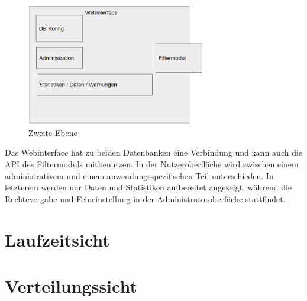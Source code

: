 \begin{figure}[h]
	\centering
	\includegraphics[width=0.7\textwidth]{Graphics/blackbox2.png}
	\caption{Zweite Ebene}
	\label{fig:zweite_ebene}
\end{figure}
Das Webinterface hat zu beiden Datenbanken eine Verbindung und kann auch die API des Filtermoduls mitbenutzen. In der Nutzeroberfläche wird zwischen einem administrativem und einem anwendungsspezifischen Teil unterschieden. In letzterem werden nur Daten und Statistiken aufbereitet angezeigt, während die Rechtevergabe und Feineinstellung in der Administratoroberfäche stattfindet. 
\section{Laufzeitsicht}
\section{Verteilungssicht}